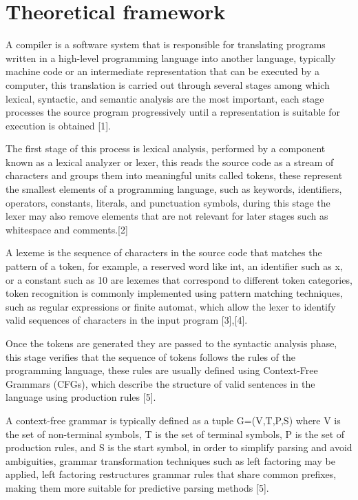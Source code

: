 \documentclass[letterpaper,12pt,oneside]{article}
\begin{document}
\section{Theoretical framework}
A compiler is a software system that is responsible for translating programs written in a high-level programming language into another language, typically machine code or an intermediate representation that can be executed by a computer, this translation is carried out through several stages among which lexical, syntactic, and semantic analysis are the most important, each stage processes the source program progressively until a representation is suitable for execution is obtained [1].

The first stage of this process is lexical analysis, performed by a component known as a lexical analyzer or lexer, this reads the source code as a stream of characters and groups them into meaningful units called tokens, these represent the smallest elements of a programming language, such as keywords, identifiers, operators, constants, literals, and punctuation symbols, during this stage the lexer may also remove elements that are not relevant for later stages such as whitespace and comments.[2]

A lexeme is the sequence of characters in the source code that matches the pattern of a token, for example, a reserved word like int, an identifier such as x, or a constant such as 10 are lexemes that correspond to different token categories, token recognition is commonly implemented using pattern matching techniques, such as regular expressions or finite automat, which allow the lexer to identify valid sequences of characters in the input program [3],[4].

Once the tokens are generated they are passed to the syntactic analysis phase, this stage verifies that the sequence of tokens follows the rules of the programming language, these rules are usually defined using Context-Free Grammars (CFGs), which describe the structure of valid sentences in the language using production rules [5].

A context-free grammar is typically defined as a tuple G=(V,T,P,S) where V is the set of non-terminal symbols, T is the set of terminal symbols, P is the set of production rules, and S is the start symbol, in order to simplify parsing and avoid ambiguities, grammar transformation techniques such as left factoring may be applied, left factoring restructures grammar rules that share common prefixes, making them more suitable for predictive parsing methods [5].
\end{document}
